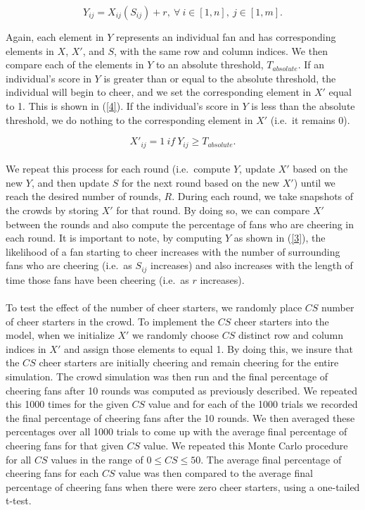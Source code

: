 \documentclass[oneside,12pt]{report}
\begin{document}
\begin{equation}
Y_{ij}=X_{ij}(S_{ij})+r,~\forall~i\in[1,n],~j\in[1,m].
\label{3}
\end{equation}

Again, each element in $Y$ represents an individual fan and has corresponding elements in $X$, $X'$, and $S$, with the same row and column indices. We then compare each of the elements in $Y$ to an absolute threshold, $T_{absolute}$. If an individual's score in $Y$ is greater than or equal to the absolute threshold, the individual will begin to cheer, and we set the corresponding element in $X'$ equal to 1. This is shown in (\ref{4}). If the individual's score in $Y$ is less than the absolute threshold, we do nothing to the corresponding element in $X'$ (i.e.~it remains 0).  

\begin{equation}
X'_{ij}=1~if~Y_{ij}\geq T_{absolute}.
\label{4}
\end{equation}

\paragraph{}
We repeat this process for each round (i.e.~compute $Y$, update $X'$ based on the new $Y$, and then update $S$ for the next round based on the new $X'$) until we reach the desired number of rounds, $R$. During each round, we take snapshots of the crowds by storing $X'$ for that round. By doing so, we can compare $X'$ between the rounds and also compute the percentage of fans who are cheering in each round. It is important to note, by computing $Y$ as shown in (\ref{3}), the likelihood of a fan starting to cheer increases with the number of surrounding fans who are cheering (i.e.~as $S_{ij}$ increases) and also increases with the length of time those fans have been cheering (i.e.~as $r$ increases).

\paragraph{}
To test the effect of the number of cheer starters, we randomly place $CS$ number of cheer starters in the crowd. To implement the $CS$ cheer starters into the model, when we initialize $X'$ we randomly choose $CS$ distinct row and column indices in $X'$ and assign those elements to equal 1. By doing this, we insure that the $CS$ cheer starters are initially cheering and remain cheering for the entire simulation. The crowd simulation was then run and the final percentage of cheering fans after 10 rounds was computed as previously described. We repeated this 1000 times for the given $CS$ value and for each of the 1000 trials we recorded the final percentage of cheering fans after the 10 rounds. We then averaged these percentages over all 1000 trials to come up with the average final percentage of cheering fans for that given $CS$ value. We repeated this Monte Carlo procedure for all $CS$ values in the range of $0 \leq CS \leq 50$. The average final percentage of cheering fans for each $CS$ value was then compared to the average final percentage of cheering fans when there were zero cheer starters, using a one-tailed t-test.
\end{document}

